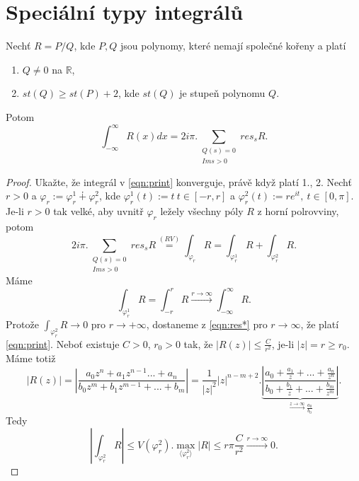 \section{Speciální typy integrálů}
\begin{theorem}
Nechť $R=P/Q$, kde $P,Q$ jsou polynomy, které nemají společné kořeny a platí 
\begin{enumerate}
    \item $Q\neq0$ na $\mathbb{R}$,
    \item $st(Q)\geq st(P)+2$, kde $st(Q)$ je stupeň polynomu $Q$.
\end{enumerate}
Potom
\begin{equation}
    \int_{-\infty}^\infty{R(x)dx}=2i\pi.\sum_{\begin{array}{cc}
         Q(s)=0  \\
         {Im}{s}>0 
    \end{array}}{res_s{R}}.
    \label{eqn:print}
\end{equation}
\end{theorem}
\begin{proof}
Ukažte, že integrál v \cref{eqn:print} konverguje, právě když platí 1., 2. Nechť $r>0$ a $\varphi_r:=\varphi^1_r\dotplus\varphi^2_r$, kde $\varphi^1_r(t):=t\ t\in[-r,r]$ a $\varphi^2_r(t):=re^{it},\ t\in[0,\pi]$. Je-li $r>0$ tak velké, aby uvnitř $\varphi_r$ ležely všechny póly $R$ z horní polrovviny, potom
\begin{equation}
    2i\pi.\sum_{\begin{array}{cc}
         Q(s)=0  \\
         {Im}{s}>0 
    \end{array}}{res_s{R}}
    \overset{(RV)}{=}
    \int_{\varphi_r}{R}=
    \int_{\varphi_r^1}{R} +\int_{\varphi_r^2}{R}.
    \label{eqn:res*}
\end{equation}
Máme 
$$\int_{\varphi_r^1}{R}=
\int_{-r}^r{R}\overset{r\to\infty}{\longrightarrow}
\int_{-\infty}^\infty{R}.$$
Protože $\int_{\varphi_r^2}{R}\to{0}$ pro $r\to{+\infty}$, dostaneme z \cref{eqn:res*} pro $r\to\infty$, že platí \cref{eqn:print}.  Neboť existuje $C>0$, $r_0>0$ tak, že $|R(z)|\leq\frac{C}{r^2}$, je-li $|z|=r\geq{r_0}$. Máme totiž
$$|R(z)|=\left|\frac{a_0 z^n+a_1 z^{n-1}...+a_n}{b_0 z^m+b_1 z^{m-1}+...+b_m}\right|=\frac{1}{|z|^2}|z|^{n-m+2}.\underset{\overset{z\to\infty}{\longrightarrow}\frac{a_0}{b_0}}{\underbrace{\left|\frac{a_0+\frac{a_1}{z}+...+\frac{a_n}{z^n}}{b_0+\frac{b_1}{z}+...+\frac{b_m}{z^m}}\right|}}.$$
Tedy
$$\left|\int_{\varphi^2_r}{R}\right|\leq V(\varphi^2_r).\max_{\langle{\varphi^2_r}\rangle}{|R|}
\leq r\pi\frac{C}{r^2}\overset{r\to\infty}{\longrightarrow}0.$$
\end{proof}

